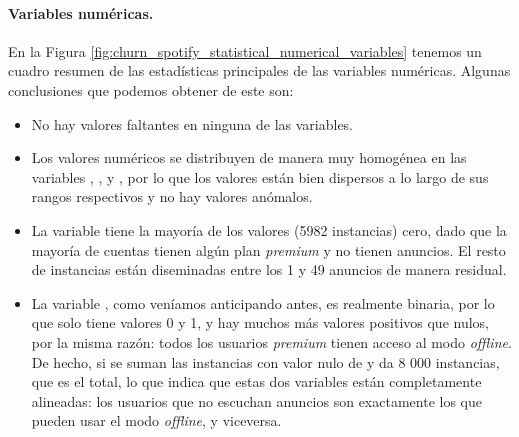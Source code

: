 
\paragraph*{Variables numéricas.}


En la Figura \ref{fig:churn_spotify_statistical_numerical_variables} tenemos un cuadro resumen de las estadísticas principales de las variables numéricas. Algunas conclusiones que podemos obtener de este son: 

\begin{itemize}

    \item No hay valores faltantes en ninguna de las variables.
    
    \item Los valores numéricos se distribuyen de manera muy homogénea en las variables , ,  y , por lo que los valores están bien dispersos a lo largo de sus rangos respectivos y no hay valores anómalos.
    
    \item La variable  tiene la mayoría de los valores (5982 instancias) cero, dado que la mayoría de cuentas tienen algún plan \textit{premium} y no tienen anuncios. El resto de instancias están diseminadas entre los 1 y 49 anuncios de manera residual.
    
    \item La variable , como veníamos anticipando antes, es realmente binaria, por lo que solo tiene valores 0 y 1, y hay muchos más valores positivos que nulos, por la misma razón: todos los usuarios \textit{premium} tienen acceso al modo \textit{offline}. De hecho, si se suman las instancias con valor nulo de  y  da 8 000 instancias, que es el total, lo que indica que estas dos variables están completamente alineadas: los usuarios que no escuchan anuncios son exactamente los que pueden usar el modo \textit{offline}, y viceversa.

\end{itemize}



